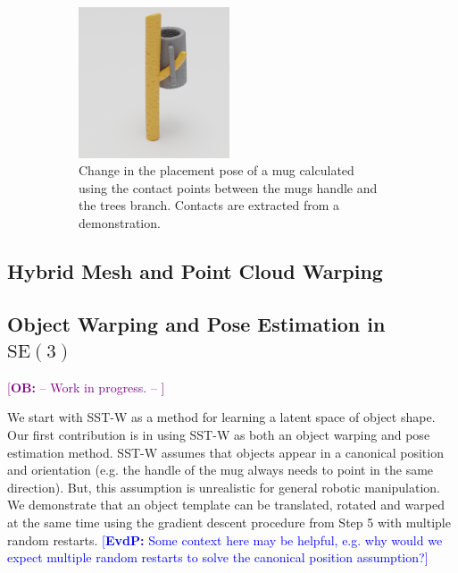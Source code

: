 \documentclass{article}
\newcommand{\ob}[1]{\textcolor{purple}{[\textbf{OB:} #1]}}
\newcommand{\evdp}[1]{\textcolor{blue}{[\textbf{EvdP:} #1]}}
\begin{document}
\begin{figure}
\begin{subfigure}[b]{0.39\textwidth}
        \includegraphics[width=0.49\textwidth]{figures/blender/warp2/mug_tree_3.png}
        \caption{Change in the placement pose of a mug calculated using the contact points between the mugs handle and the trees branch. Contacts are extracted from a demonstration.}
        \label{fig:place_warps}
    \end{subfigure}
    \caption{}
\end{figure}

\subsection{Hybrid Mesh and Point Cloud Warping}
\label{sec:methods:mesh}



\subsection{Object Warping and Pose Estimation in $\mathrm{SE}(3)$}
\label{sec:methods:scene}

\ob{-- Work in progress. -- }

We start with SST-W as a method for learning a latent space of object shape. Our first contribution is in using SST-W as both an object warping and pose estimation method. SST-W assumes that objects appear in a canonical position and orientation (e.g. the handle of the mug always needs to point in the same direction). But, this assumption is unrealistic for general robotic manipulation. We demonstrate that an object template can be translated, rotated and warped at the same time using the gradient descent procedure from Step 5 with multiple random restarts. \evdp{Some context here may be helpful, e.g. why would we expect multiple random restarts to solve the canonical position assumption?} 
\end{document}
